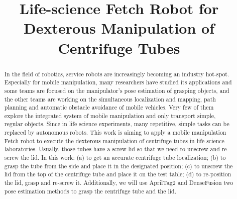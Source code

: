 \documentclass[12pt,draftclsnofoot,onecolumn]{IEEEtran}
\begin{document}
	\title{\huge Life-science Fetch Robot for \\Dexterous Manipulation of Centrifuge Tubes}
	
	\author{
	}%
	
	\maketitle
	\pagestyle{empty}  %
	\thispagestyle{empty} %
	\begin{abstract}
		In the field of robotics, service robots are increasingly becoming an industry hot-spot. Especially for mobile manipulation, many researchers have studied its applications and some teams are focused on the manipulator's pose estimation of grasping objects, and the other teams are working on the simultaneous localization and mapping, path planning and automatic obstacle avoidance of mobile vehicles. Very few of them explore the integrated system of mobile manipulation and only transport simple, regular objects.  Since in life science experiments, many repetitive, simple tasks can be replaced by autonomous robots. This work is aiming to apply a mobile manipulation Fetch robot to execute the dexterous manipulation of centrifuge tubes in life science laboratories. Usually, those tubes have a screw-lid so that we need to unscrew and re-screw the lid. In this work: (a) to get an accurate centrifuge tube localization; (b) to grasp the tube from the side and place it in the designated position; (c) to unscrew the lid from the top of the centrifuge tube and place it on the test table; (d) to re-position the lid, grasp and re-screw it. Additionally, we will use AprilTag2 and DenseFusion two pose estimation methods to grasp the centrifuge tube and the lid.
	\end{abstract}
	
	
\end{document}
